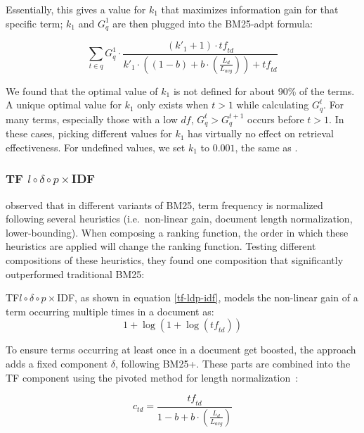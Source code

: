 Essentially, this gives a value for $k_1$ that maximizes information gain for that specific term; $k_1$ and $G^1_q$ are then plugged into the BM25-adpt formula: 

\begin{equation}
	\label{bm25-adpt}
	\sum_{t\in q}G_q^1\cdot\frac{\left(k'_1+1\right)\cdot \mathit{tf}_{\mathit{td}}}{k'_1\cdot\left(\left(1-b\right)+b\cdot\left(\frac{L_d}{L_{\mathit{avg}}}\right)\right)+\mathit{tf}_{\mathit{td}}}
\end{equation}

We found that the optimal value of $k_1$ is not defined for about 90\% of the terms. A unique optimal value for $k_1$ only exists when $t > 1$ while calculating $G^t_q$. For many terms, especially those with a low $\mathit{df}$, $G^t_q > G^{t+1}_q$ occurs before $t > 1$. In these cases, picking different values for $k_1$ has virtually no effect on retrieval effectiveness. For undefined values, we set $k_1$ to $0.001$, the same as \citet{trotman-bm25}.

\subsubsection{TF $l\circ\delta\circ p\times$IDF~\citep{tf-ldp-idf}}
 observed that in different variants of BM25, term frequency is normalized following several heuristics (i.e.\ non-linear gain, document length normalization, lower-bounding). When composing a ranking function, the order in which these heuristics are applied will change the ranking function. Testing different compositions of these heuristics, they found one composition that significantly outperformed traditional BM25:

TF$l\circ\delta\circ p\times$IDF, as shown in equation \ref{tf-ldp-idf}, models the non-linear gain of a term occurring multiple times in a document as:
\begin{equation}
	1+\log\left(1+\log\left(\mathit{tf}_{\mathit{td}}\right)\right) 
\end{equation}

To ensure terms occurring at least once in a document get boosted, the approach adds a fixed component $\delta$, following BM25+. These parts are combined into the TF component using the pivoted method for length normalization~\citep{ctd}:

\begin{equation}
	c_{\mathit{td}} = \frac{\mathit{tf}_{\mathit{td}}}{1-b+b\cdot\left(\frac{L_d}{L_{\mathit{avg}}}\right)}
\end{equation}

